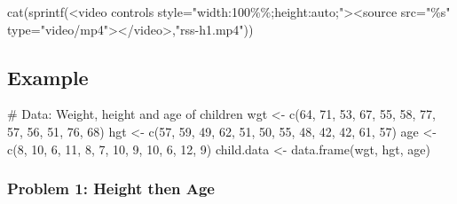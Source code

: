 \documentclass[
  letterpaper,
  DIV=11,
  numbers=noendperiod]{scrreprt}
\newenvironment{Shaded}{\begin{snugshade}}{\end{snugshade}}
\newcommand{\CommentTok}[1]{\textcolor[rgb]{0.37,0.37,0.37}{#1}}
\newcommand{\DecValTok}[1]{\textcolor[rgb]{0.68,0.00,0.00}{#1}}
\newcommand{\FunctionTok}[1]{\textcolor[rgb]{0.28,0.35,0.67}{#1}}
\newcommand{\NormalTok}[1]{\textcolor[rgb]{0.00,0.23,0.31}{#1}}
\newcommand{\OtherTok}[1]{\textcolor[rgb]{0.00,0.23,0.31}{#1}}
\newcommand{\StringTok}[1]{\textcolor[rgb]{0.13,0.47,0.30}{#1}}
\begin{document}
\begin{Shaded}
\begin{Highlighting}[]
\FunctionTok{cat}\NormalTok{(}\FunctionTok{sprintf}\NormalTok{(}\StringTok{\textquotesingle{}\textless{}video controls style="width:100\%\%;height:auto;"\textgreater{}\textless{}source src="\%s" type="video/mp4"\textgreater{}\textless{}/video\textgreater{}\textquotesingle{}}\NormalTok{,}\StringTok{"rss{-}h1.mp4"}\NormalTok{))}
\end{Highlighting}
\end{Shaded}

\subsection{Example}\label{example}

\begin{Shaded}
\begin{Highlighting}[]
\CommentTok{\# Data: Weight, height and age of children}
\NormalTok{wgt }\OtherTok{\textless{}{-}} \FunctionTok{c}\NormalTok{(}\DecValTok{64}\NormalTok{, }\DecValTok{71}\NormalTok{, }\DecValTok{53}\NormalTok{, }\DecValTok{67}\NormalTok{, }\DecValTok{55}\NormalTok{, }\DecValTok{58}\NormalTok{, }\DecValTok{77}\NormalTok{, }\DecValTok{57}\NormalTok{, }\DecValTok{56}\NormalTok{, }\DecValTok{51}\NormalTok{, }\DecValTok{76}\NormalTok{, }\DecValTok{68}\NormalTok{)}
\NormalTok{hgt }\OtherTok{\textless{}{-}} \FunctionTok{c}\NormalTok{(}\DecValTok{57}\NormalTok{, }\DecValTok{59}\NormalTok{, }\DecValTok{49}\NormalTok{, }\DecValTok{62}\NormalTok{, }\DecValTok{51}\NormalTok{, }\DecValTok{50}\NormalTok{, }\DecValTok{55}\NormalTok{, }\DecValTok{48}\NormalTok{, }\DecValTok{42}\NormalTok{, }\DecValTok{42}\NormalTok{, }\DecValTok{61}\NormalTok{, }\DecValTok{57}\NormalTok{)}
\NormalTok{age }\OtherTok{\textless{}{-}} \FunctionTok{c}\NormalTok{(}\DecValTok{8}\NormalTok{, }\DecValTok{10}\NormalTok{, }\DecValTok{6}\NormalTok{, }\DecValTok{11}\NormalTok{, }\DecValTok{8}\NormalTok{, }\DecValTok{7}\NormalTok{, }\DecValTok{10}\NormalTok{, }\DecValTok{9}\NormalTok{, }\DecValTok{10}\NormalTok{, }\DecValTok{6}\NormalTok{, }\DecValTok{12}\NormalTok{, }\DecValTok{9}\NormalTok{)}
\NormalTok{child.data }\OtherTok{\textless{}{-}} \FunctionTok{data.frame}\NormalTok{(wgt, hgt, age)}
\end{Highlighting}
\end{Shaded}

\subsubsection{Problem 1: Height then
Age}\label{problem-1-height-then-age}
\end{document}
